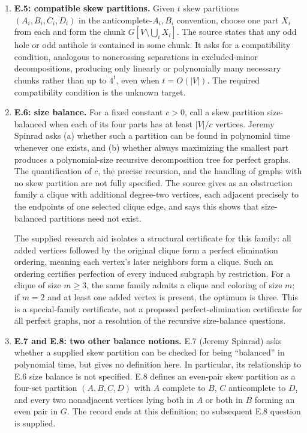 \documentclass[11pt]{article}
\begin{document}
\begin{enumerate}
Ryan Hayward's stated conjecture is: if neither $G$ nor $\overline G$ has a star cutset, then the disk structure of $G$ is connected. Its vertices are all holes and antiholes of $G$, with two disks adjacent when they share at least two vertices. The source leaves the empty-disk case and possible small-graph restrictions unstated.
\item \textbf{E.5: compatible skew partitions.} Given $t$ skew partitions $(A_i,B_i,C_i,D_i)$ in the anticomplete-$A_i,B_i$ convention, choose one part $X_i$ from each and form the chunk $G[V\setminus\bigcup_i X_i]$. The source states that any odd hole or odd antihole is contained in some chunk. It asks for a compatibility condition, analogous to noncrossing separations in excluded-minor decompositions, producing only linearly or polynomially many necessary chunks rather than up to $4^t$, even when $t=O(|V|)$. The required compatibility condition is the unknown target.
\item \textbf{E.6: size balance.} For a fixed constant $c>0$, call a skew partition size-balanced when each of its four parts has at least $|V|/c$ vertices. Jeremy Spinrad asks (a) whether such a partition can be found in polynomial time whenever one exists, and (b) whether always maximizing the smallest part produces a polynomial-size recursive decomposition tree for perfect graphs. The quantification of $c$, the precise recursion, and the handling of graphs with no skew partition are not fully specified. The source gives as an obstruction family a clique with additional degree-two vertices, each adjacent precisely to the endpoints of one selected clique edge, and says this shows that size-balanced partitions need not exist.

The supplied research aid isolates a structural certificate for this family: all added vertices followed by the original clique form a perfect elimination ordering, meaning each vertex's later neighbors form a clique. Such an ordering certifies perfection of every induced subgraph by restriction. For a clique of size $m\geq3$, the same family admits a clique and coloring of size $m$; if $m=2$ and at least one added vertex is present, the optimum is three. This is a special-family certificate, not a proposed perfect-elimination certificate for all perfect graphs, nor a resolution of the recursive size-balance questions.
\item \textbf{E.7 and E.8: two other balance notions.} E.7 (Jeremy Spinrad) asks whether a supplied skew partition can be checked for being ``balanced'' in polynomial time, but gives no definition here. In particular, its relationship to E.6 size balance is not specified. E.8 defines an even-pair skew partition as a four-set partition $(A,B,C,D)$ with $A$ complete to $B$, $C$ anticomplete to $D$, and every two nonadjacent vertices lying both in $A$ or both in $B$ forming an even pair in $G$. The record ends at this definition; no subsequent E.8 question is supplied.
\end{enumerate}
\end{document}
